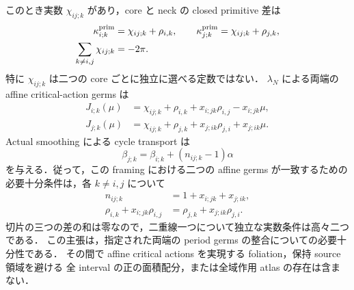 \begin{proposition}
このとき実数 $\chi_{ij;k}$ があり，core と neck の closed primitive 差は
\begin{equation}\label{ke:eq:actual-neck-residual-constants}
 \begin{split}
 \kappa^{\rm prim}_{i;k}&=\chi_{ij;k}+\rho_{i,k},\qquad
 \kappa^{\rm prim}_{j;k}=\chi_{ij;k}+\rho_{j,k},\\
 \sum_{k\ne i,j}\chi_{ij;k}&=-2\pi .
 \end{split}
\end{equation}
特に $\chi_{ij;k}$ は二つの core ごとに独立に選べる定数ではない．
$\lambda_N$ による両端の affine critical-action germs は
\begin{equation}\label{ke:eq:actual-neck-affine-germs}
 \begin{split}
 J_{i;k}(\mu)&=\chi_{ij;k}+\rho_{i,k}
                   +x_{i;jk}\rho_{i,j}-x_{i;jk}\mu,\\
 J_{j;k}(\mu)&=\chi_{ij;k}+\rho_{j,k}
                   +x_{j;ik}\rho_{j,i}+x_{j;ik}\mu .
 \end{split}
\end{equation}
Actual smoothing による cycle transport は
\begin{equation}\label{ke:eq:actual-neck-source-shear}
 \beta_{j;k}=\beta_{i;k}+(n_{ij;k}-1)\alpha
\end{equation}
を与える．従って，この framing における二つの affine germs が一致するための
必要十分条件は，各 $k\ne i,j$ について
\begin{align}
 n_{ij;k}&=1+x_{i;jk}+x_{j;ik},
       \label{ke:eq:actual-neck-integer-condition}\\
 \rho_{i,k}+x_{i;jk}\rho_{i,j}
   &=\rho_{j,k}+x_{j;ik}\rho_{j,i}.
       \label{ke:eq:actual-neck-intercept-condition}
\end{align}
切片の三つの差の和は零なので，二重線一つについて独立な実数条件は高々二つである．
この主張は，指定された両端の period germs の整合についての必要十分性である．
その間で affine critical actions を実現する foliation，保持 source 領域を避ける
全 interval の正の面積配分，または全域作用 atlas の存在は含まない．
\end{proposition}

